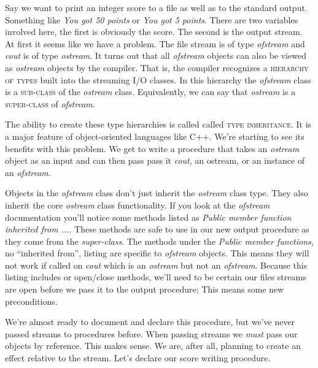 \documentclass[]{tufte-handout}
\begin{document}
Say we want to print an integer score to a file as well as to the standard output. Something like \textit{You got 50 points} or \textit{You got 5 points}.  There are two variables involved here, the first is obviously the score. The second is the output stream.  At first it seems like we have a problem.  The file stream is of type \textit{ofstream} and \textit{cout} is of type \textit{ostream}. It turns out that all \textit{ofstream} objects can also be viewed as \textit{ostream} objects by the compiler. That is, the compiler recognizes a \textsc{hierarchy of types} built into the streaming I/O classes. In this hierarchy the \textit{ofstream} class is a \textsc{sub-class} of the \textit{ostream} class. Equivalently, we can say that \textit{ostream} is a \textsc{super-class} of \textit{ofstream}. 

The ability to create these type hierarchies is called called \textsc{type inheritance}. It is a major feature of object-oriented languages like C++. We're starting to see its benefits with this problem.  We get to write a procedure that takes an \textit{ostream} object as an input and can then pass pass it \textit{cout}, an ostream, or an instance of an \textit{ofstream}.    

Objects in the \textit{ofstream} class don't just inherit the \textit{ostream} class type. They also inherit the core \textit{ostream} class functionality. If you look at the \textit{ofstream} documentation you'll notice some methods listed as \textit{Public member function inherited from ...}. These methods are safe to use in our new output procedure as they come from the \textit{super-class}. The methods under the \textit{Public member functions}, no ``inherited from'', listing are specific to \textit{ofstream} objects.  This means they will not work if called on \textit{cout} which is an \textit{ostream} but not an \textit{ofstream}. Because this listing includes or open/close methods, we'll need to be certain our files streams are open before we pass it to the output procedure; This means some new preconditions. 

We're almost ready to document and declare this procedure, but we've never passed streams to procedures before.  When passing streams we \textit{must} pass our objects by reference. This makes sense. We are, after all, planning to create an effect relative to the stream. Let's declare our score writing procedure.
\end{document}
